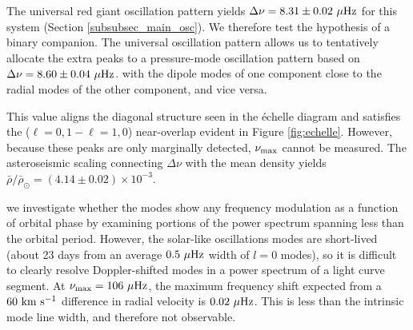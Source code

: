 The universal red giant oscillation pattern \citep{mos11} yields $\Delta \nu =  8.31 \pm 0.02 \ \mu\rm{Hz}$ for this system (Section \ref{subsubsec_main_osc}). 
We therefore test the hypothesis of a binary companion. The universal oscillation pattern allows us to tentatively allocate the extra peaks to a pressure-mode oscillation pattern based on $\Delta \nu = 8.60 \pm 0.04 \ \mu\rm{Hz}$.  with the dipole modes of one component close to the radial modes of the other component, and vice versa.

This value aligns the diagonal structure seen in the \'echelle diagram and satisfies the ($\ell=0,1-\ell=1,0$) near-overlap evident in Figure \ref{fig:echelle}. However, because these peaks are only marginally detected, $\nu_{\rm{max}}$ cannot be measured. The asteroseismic scaling connecting $\Delta\nu$ with the mean density yields $\bar{\rho}/\bar{\rho}_\odot = (4.14 \pm 0.02)\times 10^{-3}$.  

 we investigate whether the modes show any frequency modulation as a function of orbital phase by examining portions of the power spectrum spanning less than the orbital period. However, the solar-like oscillations modes are short-lived (about 23 days from an average $0.5 \ \mu\rm{Hz}$ width of $l=0$ modes), so it is difficult to clearly resolve Doppler-shifted modes in a power spectrum of a light curve segment. At $\nu_{\rm{max}} = 106 \ \mu \rm{Hz}$, the maximum frequency shift expected from a $60 \ \rm{km} \ \rm{s}^{-1}$ difference in radial velocity is $0.02 \ \mu \rm{Hz}$. This is less than the intrinsic mode line width, and therefore not observable.
